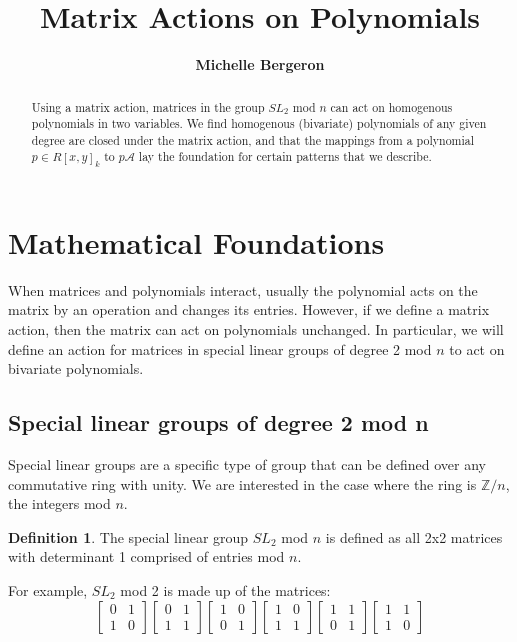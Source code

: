 \documentclass[a4paper,draft]{amsproc}
\title[Matrix Actions]{Matrix Actions on Polynomials}
\author[Bergeron]{\bfseries Michelle Bergeron}
\theoremstyle{plain}
\theoremstyle{definition}
\newtheorem{dfn}{Definition}[section]
\theoremstyle{remark}
\numberwithin{equation}{section}
\begin{document}
\vspace{18mm} \setcounter{page}{1} \thispagestyle{empty}


\begin{abstract}
Using a matrix action, matrices in the group $SL_{2}$ mod $n$ can act on homogenous polynomials in two variables. We find homogenous (bivariate) polynomials of any given degree are closed under the matrix action, and that the mappings from a polynomial $p \in R[x,y]_{k}$ to  $p\mathcal{A}$ lay the foundation for certain patterns that we describe. 
\end{abstract}

\maketitle

\section{Mathematical Foundations} 

When matrices and polynomials interact, usually the polynomial acts on the matrix by an operation and changes its entries. However, if we define a matrix action, then the matrix can act on polynomials unchanged. In particular, we will define an action for matrices in special linear groups of degree 2 mod $n$ to act on bivariate polynomials. 

\subsection{Special linear groups of degree 2 mod n}
Special linear groups are a specific type of group that can be defined over any commutative ring with unity. We are interested in the case where the ring is $\mathbb{Z}/n$, the integers mod $n$. 
\begin{dfn}
The special linear group $SL_{2}$ mod $n$ is defined as all 2x2 matrices with determinant 1 comprised of entries mod $n$.
\end{dfn}

For example, $SL_{2}$ mod 2 is made up of the matrices:
$$
\begin{bmatrix}
 0&1 \\ 
 1&0 
\end{bmatrix}
\begin{bmatrix}
 0&1 \\ 
 1&1 
\end{bmatrix}
\begin{bmatrix}
 1&0 \\ 
 0&1 
\end{bmatrix}
\begin{bmatrix}
 1&0 \\ 
 1&1 
\end{bmatrix}
\begin{bmatrix}
 1&1 \\ 
 0&1 
\end{bmatrix}
\begin{bmatrix}
 1&1 \\ 
 1&0 
\end{bmatrix}
$$
\end{document}
